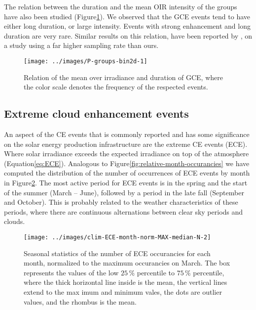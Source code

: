\documentclass[preprint, 5p,
authoryear]{elsarticle} %
\begin{document}
The relation between the duration and the mean OIR intensity of the
groups have also been studied (Figure\nobreakspace{}\ref{fig:group-2d}).
We observed that the GCE events tend to have either long duration, or
large intensity. Events with strong enhancement and long duration are
very rare. Similar results on this relation, have been reported by
\citet{Zhang2018}, on a study using a far higher sampling rate than
ours.

\begin{figure}

{\centering \texttt{[image: ../images/P-groups-bin2d-1]} 

}

\caption{Relation of the mean over irradiance and duration of GCE, where the color scale denotes the frequency of the respected events.}\label{fig:group-2d}
\end{figure}

\hypertarget{extreme-cloud-enhancement-events}{%
\subsection{Extreme cloud enhancement
events}\label{extreme-cloud-enhancement-events}}

An aspect of the CE events that is commonly reported and has some
significance on the solar energy production infrastructure are the
extreme CE events (ECE). Where solar irradiance exceeds the expected
irradiance on top of the atmosphere
(Equation\nobreakspace{}\ref{eq:ECE}). Analogous to
Figure\nobreakspace{}\ref{fig:relative-month-occurancies} we have
computed the distribution of the number of occurrences of ECE events by
month in Figure\nobreakspace{}\ref{fig:relative-month-occurancies-ECE}.
The most active period for ECE events is in the spring and the start of
the summer (March -- June), followed by a period in the late fall
(September and October). This is probably related to the weather
characteristics of these periods, where there are continuous
alternations between clear sky periods and clouds.

\begin{figure}

{\centering \texttt{[image: ../images/clim-ECE-month-norm-MAX-median-N-2]} 

}

\caption{Seasonal statistics of the number of ECE occurancies for each month, normalized to the maximum occurancies on March. The box represents the values of the low $25\,\%$ percentile to $75\,\%$ percentile, where the thick horizontal line inside is the mean, the vertical lines extend to the max imum and minimum vales, the dots are outlier values, and the rhombus is the mean.}\label{fig:relative-month-occurancies-ECE}
\end{figure}
\end{document}
